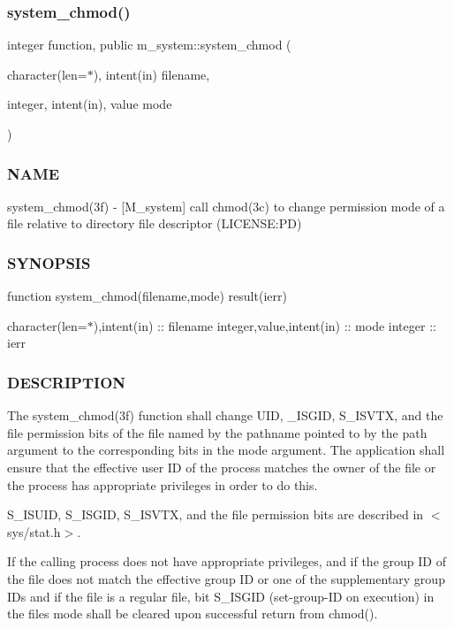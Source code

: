 \subsubsection{\texorpdfstring{system\+\_\+chmod()}{system\_chmod()}}
{\footnotesize\ttfamily integer function, public m\+\_\+system\+::system\+\_\+chmod (\begin{DoxyParamCaption}\item[{character(len=$\ast$), intent(in)}]{filename,  }\item[{integer, intent(in), value}]{mode }\end{DoxyParamCaption})}



\subsubsection*{N\+A\+ME}

system\+\_\+chmod(3f) -\/ \mbox{[}M\+\_\+system\mbox{]} call chmod(3c) to change permission mode of a file relative to directory file descriptor (L\+I\+C\+E\+N\+SE\+:PD) \subsubsection*{S\+Y\+N\+O\+P\+S\+IS}

function system\+\_\+chmod(filename,mode) result(ierr)

character(len=$\ast$),intent(in) \+:\+: filename integer,value,intent(in) \+:\+: mode integer \+:\+: ierr

\subsubsection*{D\+E\+S\+C\+R\+I\+P\+T\+I\+ON}

The system\+\_\+chmod(3f) function shall change U\+ID, \+\_\+\+I\+S\+G\+ID, S\+\_\+\+I\+S\+V\+TX, and the file permission bits of the file named by the pathname pointed to by the path argument to the corresponding bits in the mode argument. The application shall ensure that the effective user ID of the process matches the owner of the file or the process has appropriate privileges in order to do this.

S\+\_\+\+I\+S\+U\+ID, S\+\_\+\+I\+S\+G\+ID, S\+\_\+\+I\+S\+V\+TX, and the file permission bits are described in $<$sys/stat.\+h$>$.

If the calling process does not have appropriate privileges, and if the group ID of the file does not match the effective group ID or one of the supplementary group I\+Ds and if the file is a regular file, bit S\+\_\+\+I\+S\+G\+ID (set-\/group-\/\+ID on execution) in the file\textquotesingle{}s mode shall be cleared upon successful return from chmod().

